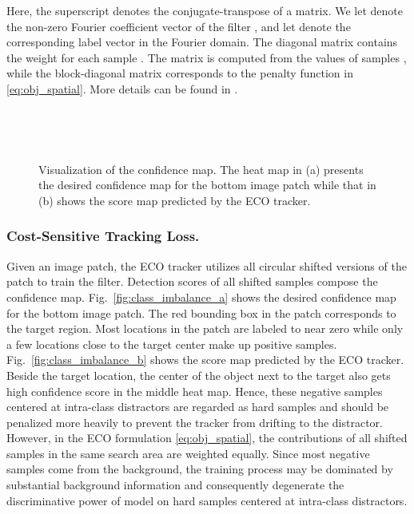 \documentclass[runningheads]{llncs}
\begin{document}
  Here, the superscript  denotes the conjugate-transpose of a matrix. We let  denote the non-zero Fourier coefficient vector of the filter , and let  denote the corresponding label vector in the Fourier domain. The diagonal matrix  contains the weight  for each sample . The matrix  is computed from the values of samples , while the block-diagonal matrix  corresponds to the penalty function  in \eqref{eq:obj_spatial}. 
More details can be found in \cite{ECO,CCOT}.
\begin{figure}[t]\label{fig:class_imbalance}
  \begin{minipage}[t]{0.5\textwidth}
  \centering
  \\
  \end{minipage}\begin{minipage}[t]{0.5\textwidth}
  \centering
   \\
  \end{minipage}
  \caption{Visualization of the confidence map. The heat map in (a) presents the desired confidence map for the bottom image patch while that in (b) shows the score map predicted by the ECO tracker.}
  \vspace{-4mm}
  \end{figure}
  
  \subsubsection{Cost-Sensitive Tracking Loss.}
  Given an image patch, the ECO tracker utilizes all circular shifted versions of the patch to train the filter. 
Detection scores of all shifted samples compose the confidence map. Fig.~\ref{fig:class_imbalance_a} shows the desired confidence map for the bottom image patch. 
The red bounding box in the patch corresponds to the target region.  
Most locations in the patch are labeled to near zero while only a few locations close to the target center make up positive samples. 
Fig.~\ref{fig:class_imbalance_b} shows the score map predicted by the ECO tracker. 
Beside the target location, the center of the object next to the target also gets high confidence score in the middle heat map. 
Hence, these negative samples centered at intra-class distractors are regarded as hard samples and should be penalized more heavily to prevent the tracker from drifting to the distractor. 
However, in the ECO formulation \eqref{eq:obj_spatial}, the contributions of all shifted samples in the same search area are weighted equally. 
Since most negative samples come from the background, the training process may be dominated by substantial background information and consequently degenerate the discriminative power of model on hard samples centered at intra-class distractors.
  
\end{document}
